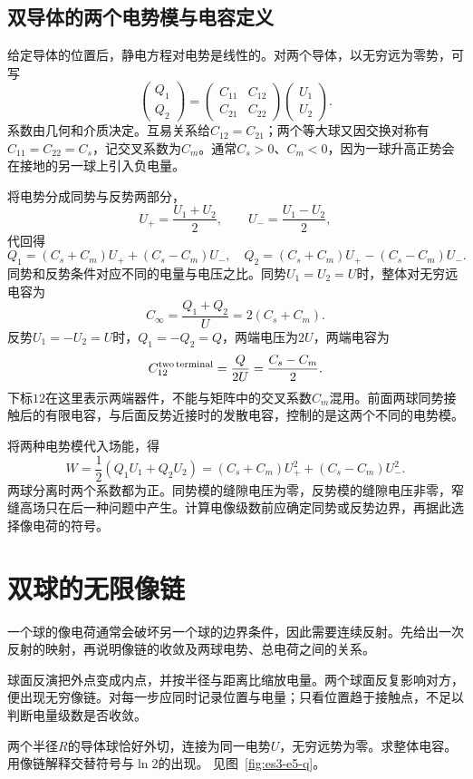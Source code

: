 \subsection{双导体的两个电势模与电容定义}\label{sec:es-capacitance-modes}
给定导体的位置后，静电方程对电势是线性的。对两个导体，以无穷远为零势，可写
\[\begin{pmatrix}Q_1\\Q_2\end{pmatrix}
=\begin{pmatrix}C_{11}&C_{12}\\C_{21}&C_{22}\end{pmatrix}
\begin{pmatrix}U_1\\U_2\end{pmatrix}.
\]
系数由几何和介质决定。互易关系给$C_{12}=C_{21}$；两个等大球又因交换对称有$C_{11}=C_{22}=C_s$，记交叉系数为$C_m$。通常$C_s>0$、$C_m<0$，因为一球升高正势会在接地的另一球上引入负电量。

将电势分成同势与反势两部分，
\[U_+=\frac{U_1+U_2}{2},\qquad U_-=\frac{U_1-U_2}{2},
\]
代回得
\[Q_1=(C_s+C_m)U_++(C_s-C_m)U_-,
\quad Q_2=(C_s+C_m)U_+-(C_s-C_m)U_-.
\]
同势和反势条件对应不同的电量与电压之比。同势$U_1=U_2=U$时，整体对无穷远电容为
\[C_{\infty}=\frac{Q_1+Q_2}{U}=2(C_s+C_m).
\]
反势$U_1=-U_2=U$时，$Q_1=-Q_2=Q$，两端电压为$2U$，两端电容为
\[C_{12}^{\rm two\,terminal}=\frac Q{2U}=\frac{C_s-C_m}{2}.
\]
下标$12$在这里表示两端器件，不能与矩阵中的交叉系数$C_m$混用。前面两球同势接触后的有限电容，与后面反势近接时的发散电容，控制的是这两个不同的电势模。

将两种电势模代入场能，得
\[W=\frac12(Q_1U_1+Q_2U_2)
=(C_s+C_m)U_+^2+(C_s-C_m)U_-^2.
\]
两球分离时两个系数都为正。同势模的缝隙电压为零，反势模的缝隙电压非零，窄缝高场只在后一种问题中产生。计算电像级数前应确定同势或反势边界，再据此选择像电荷的符号。



\section{双球的无限像链}\label{sec:es3-double}
一个球的像电荷通常会破坏另一个球的边界条件，因此需要连续反射。先给出一次反射的映射，再说明像链的收敛及两球电势、总电荷之间的关系。

球面反演把外点变成内点，并按半径与距离比缩放电量。两个球面反复影响对方，便出现无穷像链。对每一步应同时记录位置与电量；只看位置趋于接触点，不足以判断电量级数是否收敛。

\begin{example}[相接等球对无穷远的电容]\label{ex:es3-e5}
两个半径$R$的导体球恰好外切，连接为同一电势$U$，无穷远势为零。求整体电容。用像链解释交替符号与$\ln2$的出现。 见图~\ref{fig:es3-e5-q}。
\end{example}

